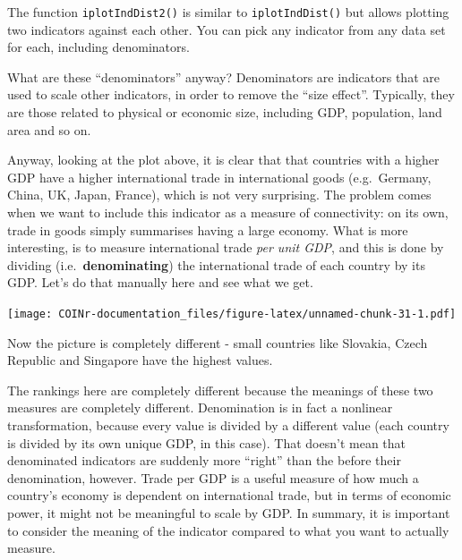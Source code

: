 \documentclass[
]{book}
\newenvironment{Shaded}{\begin{snugshade}}{\end{snugshade}}
\newcommand{\AttributeTok}[1]{\textcolor[rgb]{0.77,0.63,0.00}{#1}}
\newcommand{\CommentTok}[1]{\textcolor[rgb]{0.56,0.35,0.01}{\textit{#1}}}
\newcommand{\FunctionTok}[1]{\textcolor[rgb]{0.00,0.00,0.00}{#1}}
\newcommand{\NormalTok}[1]{#1}
\newcommand{\OtherTok}[1]{\textcolor[rgb]{0.56,0.35,0.01}{#1}}
\newcommand{\SpecialCharTok}[1]{\textcolor[rgb]{0.00,0.00,0.00}{#1}}
\begin{document}
The function \texttt{iplotIndDist2()} is similar to \texttt{iplotIndDist()} but allows plotting two indicators against each other. You can pick any indicator from any data set for each, including denominators.

What are these ``denominators'' anyway? Denominators are indicators that are used to scale other indicators, in order to remove the ``size effect''. Typically, they are those related to physical or economic size, including GDP, population, land area and so on.

Anyway, looking at the plot above, it is clear that that countries with a higher GDP have a higher international trade in international goods (e.g.~Germany, China, UK, Japan, France), which is not very surprising. The problem comes when we want to include this indicator as a measure of connectivity: on its own, trade in goods simply summarises having a large economy. What is more interesting, is to measure international trade \emph{per unit GDP}, and this is done by dividing (i.e.~\textbf{denominating}) the international trade of each country by its GDP. Let's do that manually here and see what we get.

\begin{Shaded}
\end{Shaded}

\texttt{[image: COINr-documentation\_files/figure-latex/unnamed-chunk-31-1.pdf]}

Now the picture is completely different - small countries like Slovakia, Czech Republic and Singapore have the highest values.

The rankings here are completely different because the meanings of these two measures are completely different. Denomination is in fact a nonlinear transformation, because every value is divided by a different value (each country is divided by its own unique GDP, in this case). That doesn't mean that denominated indicators are suddenly more ``right'' than the before their denomination, however. Trade per GDP is a useful measure of how much a country's economy is dependent on international trade, but in terms of economic power, it might not be meaningful to scale by GDP. In summary, it is important to consider the meaning of the indicator compared to what you want to actually measure.
\end{document}
